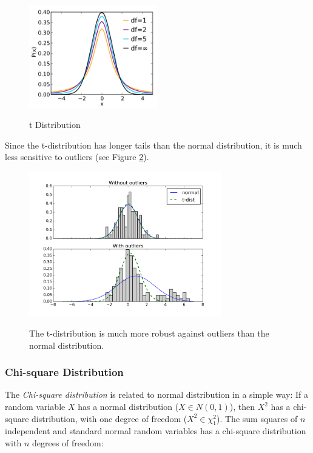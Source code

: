 \begin{figure}
  \centering
  \includegraphics[width=0.5\textwidth]{../Images/Student_t_pdf.png}\\
  \caption{t Distribution}\label{fig:t}
\end{figure}

Since the t-distribution has longer tails than the normal distribution, it is much less sensitive to outliers (see Figure \ref{fig:ttest_stability}).

\begin{figure}
  \centering
  \includegraphics[width=0.75\textwidth]{../Images/ttest_stability.png}\\
  \caption{The t-distribution is much more robust against outliers than the normal distribution.}\label{fig:ttest_stability}
\end{figure}


\subsubsection{Chi-square Distribution}

The \emph{Chi-square distribution} is related to normal distribution in a simple way: If a random variable $X$ has a normal distribution ($X \in N(0,1)$), then $X^2$ has a chi-square distribution, with one degree of freedom ($X^2 \in \chi_{1}^2$). The sum squares of $n$ independent and standard normal random variables has a chi-square distribution with $n$ degrees of freedom:

